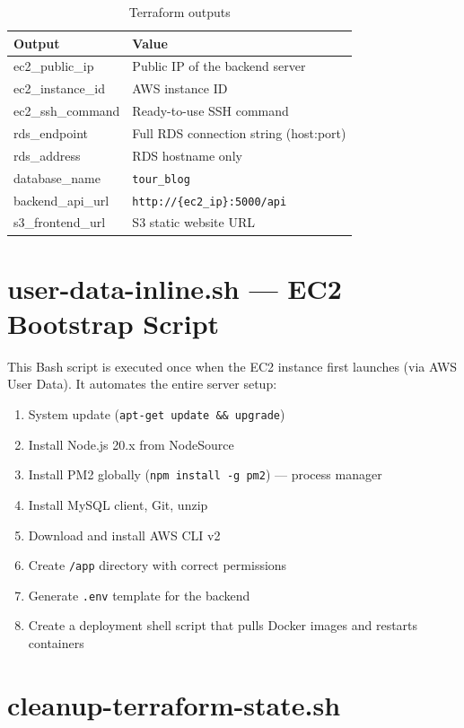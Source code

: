 \documentclass[12pt,a4paper]{report}
\begin{document}
\begin{table}[H]
  \centering
  \caption{Terraform outputs}
  \begin{tabular}{ll}
    \toprule
    \textbf{Output} & \textbf{Value} \\
    \midrule
    ec2\_public\_ip    & Public IP of the backend server \\
    ec2\_instance\_id  & AWS instance ID \\
    ec2\_ssh\_command  & Ready-to-use SSH command \\
    rds\_endpoint     & Full RDS connection string (host:port) \\
    rds\_address      & RDS hostname only \\
    database\_name    & \texttt{tour\_blog} \\
    backend\_api\_url & \texttt{http://\{ec2\_ip\}:5000/api} \\
    s3\_frontend\_url & S3 static website URL \\
    \bottomrule
  \end{tabular}
\end{table}

\section{user-data-inline.sh --- EC2 Bootstrap Script}

This Bash script is executed once when the EC2 instance first launches (via AWS User Data). It automates the entire server setup:

\begin{enumerate}[leftmargin=2em]
  \item System update (\texttt{apt-get update \&\& upgrade})
  \item Install Node.js 20.x from NodeSource
  \item Install PM2 globally (\texttt{npm install -g pm2}) --- process manager
  \item Install MySQL client, Git, unzip
  \item Download and install AWS CLI v2
  \item Create \texttt{/app} directory with correct permissions
  \item Generate \texttt{.env} template for the backend
  \item Create a deployment shell script that pulls Docker images and restarts containers
\end{enumerate}

\section{cleanup-terraform-state.sh}
\end{document}
